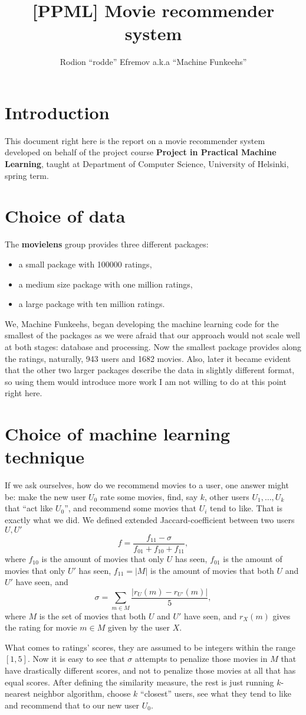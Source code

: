 \documentclass[10pt]{article}
\title{[PPML] Movie recommender system}
\author{Rodion ``rodde'' Efremov a.k.a ``Machine Funkeehs''}
\begin{document}
 \maketitle

\section{Introduction}
This document right here is the report on a movie recommender system developed on behalf of the project course \textbf{Project in Practical Machine Learning}, taught at Department of Computer Science, University of Helsinki, spring term.

\section{Choice of data}
The \textbf{movielens} group provides three different packages:
\begin{itemize}
\item a small package with 100000 ratings,
\item a medium size package with one million ratings,
\item a large package with ten million ratings.
\end{itemize}
We, Machine Funkeehs, began developing the machine learning code for the smallest of the packages as we were afraid that our approach would not scale well at both stages: database and processing. Now the smallest package provides along the ratings, naturally, 943 users and 1682 movies. Also, later it became evident that the other two larger packages describe the data in slightly different format, so using them would introduce more work I am not willing to do at this point right here.

\section{Choice of machine learning technique}
If we ask ourselves, how do we recommend movies to a user, one answer might be: make the new user $U_0$ rate some movies, find, say $k$, other users $U_1, \dots, U_k$ that ``act like $U_0$'', and recommend some movies that $U_i$ tend to like. That is exactly what we did. We defined extended Jaccard-coefficient between two users $U, U'$
\[
f = \frac{f_{11} - \sigma}{f_{01} + f_{10} + f_{11}},
\]
where $f_{10}$ is the amount of movies that only $U$ has seen, $f_{01}$ is the amount of movies that only $U'$ has seen, $f_{11} = |M|$ is the amount of movies that both $U$ and $U'$ have seen, and
\[
\sigma = \sum_{m \in M} \frac{|r_U(m) - r_{U'}(m)|}{5},
\]
where $M$ is the set of movies that both $U$ and $U'$ have seen, and $r_X(m)$ gives the rating for movie $m \in M$ given by the user $X$.

What comes to ratings' scores, they are assumed to be integers within the range $[1, 5]$. Now it is easy to see that $\sigma$ attempts to penalize those movies in $M$ that have drastically different scores, and not to penalize those movies at all that has equal scores. After defining the similarity measure, the rest is just running $k$-nearest neighbor algorithm, choose $k$ ``closest'' users, see what they tend to like and recommend that to our new user $U_0$. 
\end{document}
